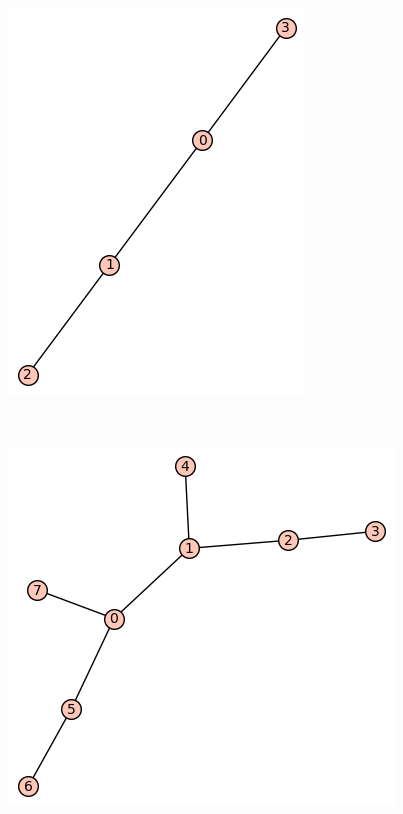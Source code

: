 \documentclass[12pt, a4paper]{article}
\begin{document}
\begin{figure}[h!]
\centering
\includegraphics[width=\linewidth]{t-3}
\end{figure} \\

\begin{figure}[h!]
\centering
\includegraphics[width=\linewidth]{t-30}
\end{figure} \\
\end{document}
